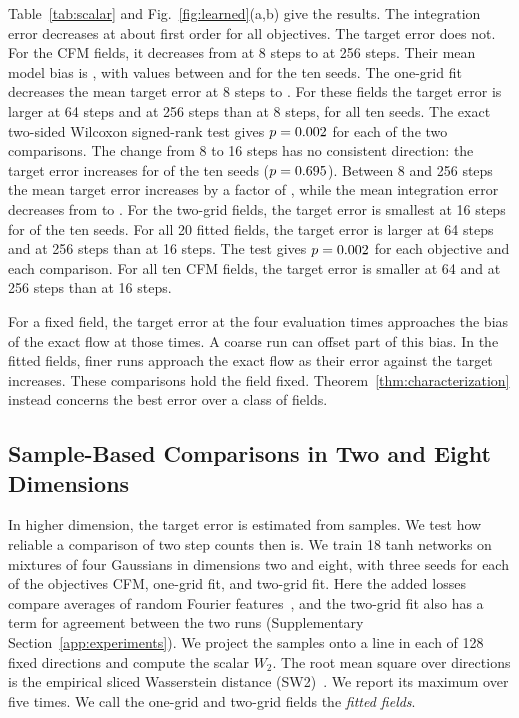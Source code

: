 Table~\ref{tab:scalar} and Fig.~\ref{fig:learned}(a,b) give the results.
The integration error decreases at about first order for all objectives. The
target error does not. For the CFM fields, it decreases from
\ScalarCfmEight{} at 8 steps to \ScalarCfmLarge{} at 256 steps. Their
mean model bias is \ScalarCfmBias{}, with values between
\ScalarCfmBiasMin{} and \ScalarCfmBiasMax{} for the ten seeds. The one-grid fit decreases the mean target error
at 8 steps to \ScalarOneEight{}. For these fields the target error is
larger at 64 steps and at 256 steps than at 8 steps, for all ten seeds.
The exact two-sided Wilcoxon signed-rank test gives
$p=0.002$ for each of the two comparisons. The change from 8
to 16 steps has no consistent direction: the target error increases for
\ScalarOneIncreaseSixteen{} of the ten seeds ($p=0.695$).
Between 8 and 256 steps the mean target error increases by a factor of
\ScalarOneGridFactor{}, while the mean integration error decreases from
\ScalarOneOwnEight{} to \ScalarOneOwnLarge{}. For the two-grid fields,
the target error is smallest at 16 steps for \ScalarTwoArgminSixteen{}
of the ten seeds. For all 20 fitted fields, the target error is larger
at 64 steps and at 256 steps than at 16 steps. The test gives
$p=0.002$ for each objective and each
comparison. For all ten CFM fields, the target error is smaller at 64
and at 256 steps than at 16 steps.

For a fixed field, the target error at the four evaluation times
approaches the bias of the exact flow at those times. A coarse run can
offset part of this bias. In the fitted fields, finer runs approach
the exact flow as their error against the target increases. These
comparisons hold the field fixed. Theorem~\ref{thm:characterization}
instead concerns the best error over a class of fields.

\subsection{Sample-Based Comparisons in Two and Eight Dimensions}
\label{sec:sample-based}
In higher dimension, the target error is estimated from samples. We
test how reliable a comparison of two step counts then is. We train 18
tanh networks on mixtures of four Gaussians in dimensions two and
eight, with three seeds for each of the objectives CFM, one-grid fit,
and two-grid fit. Here the added losses compare averages of random
Fourier features~\citep{gretton2012kernel}, and the two-grid fit also
has a term for agreement between the two runs (Supplementary
Section~\ref{app:experiments}). We project the samples onto a line in each of 128 fixed directions
and compute the scalar $W_2$. The root mean square over directions is
the empirical sliced Wasserstein distance (SW2)~\citep{bonneel2015sliced}.
We report its maximum over five times. We call the one-grid and
two-grid fields the \emph{fitted fields}.


